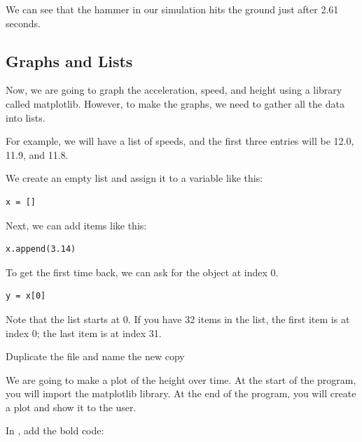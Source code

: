 We can see that the hammer in our simulation hits the ground just
after 2.61 seconds.

\subsection{Graphs and Lists}

Now, we are going to graph the acceleration, speed, and height using a
library called matplotlib. However, to make the graphs, we
need to gather all the data into lists.

For example, we will have a list of speeds, and the first three
entries will be 12.0, 11.9, and 11.8.

We create an empty list and assign it to a variable like this:
\begin{Verbatim}
x = []
\end{Verbatim}

Next, we can add items like this:
\begin{Verbatim}
x.append(3.14)
\end{Verbatim}

To get the first time back, we can ask for the object at index 0.
\begin{Verbatim}
y = x[0]
\end{Verbatim}
Note that the list starts at 0. If you have 32 items in the list,
the first item is at index 0; the last item is at index 31.

Duplicate the file  and name the new copy 

We are going to make a plot of the height over time. At the start of the program, you will import the
matplotlib library.  At the end of the program, you will create a plot and show it to the user.

In , add the bold code:

